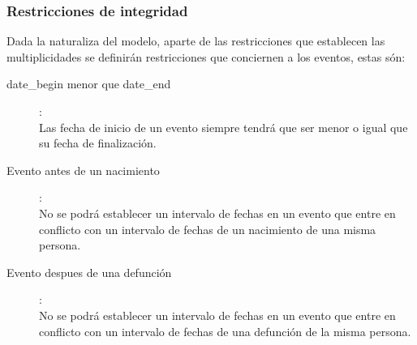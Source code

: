 \subsubsection{Restricciones de integridad}
Dada la naturaliza del modelo, aparte de las restricciones que establecen las multiplicidades se definirán restricciones que conciernen a los eventos, estas són:
\begin{description}
	\item[date\_begin menor que date\_end]:\\ Las fecha de inicio de un evento siempre tendrá que ser menor o igual que su fecha de finalización.
	\item[Evento antes de un nacimiento]:\\ No se podrá establecer un intervalo de fechas en un evento que entre en conflicto con un intervalo de fechas de un nacimiento de una misma persona.
	\item[Evento despues de una defunción]: \\ No se podrá establecer un intervalo de fechas en un evento que entre en conflicto con un intervalo de fechas de una defunción de la misma persona.
\end{description}

